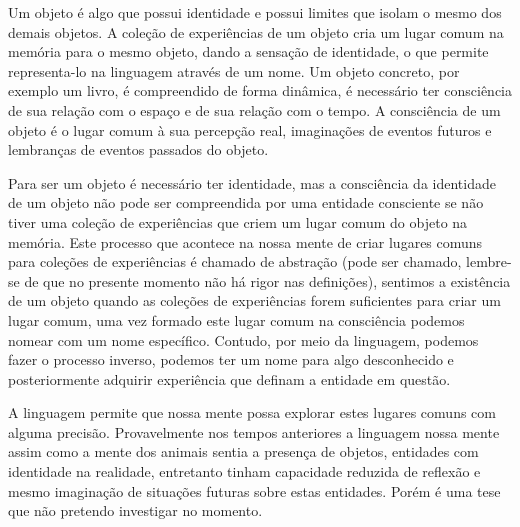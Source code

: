 \documentclass[10pt,a4paper]{report}
\begin{document}
\hspace{\baselineskip}

Um objeto é algo que possui identidade e possui limites que isolam o mesmo dos demais objetos. A coleção de experiências de um objeto cria um lugar comum na memória para o mesmo objeto, dando a sensação de identidade, o que permite representa-lo na linguagem através de um nome. Um objeto concreto, por exemplo um livro, é compreendido de forma dinâmica, é necessário ter consciência de sua relação com o espaço e de sua relação com o tempo. A consciência de um objeto é o lugar comum à sua percepção real, imaginações de eventos futuros e lembranças de eventos passados do objeto. 

\hspace{\baselineskip}

Para ser um objeto é necessário ter identidade, mas a consciência da identidade de um objeto não pode ser compreendida por uma entidade consciente se não tiver uma coleção de experiências que criem um lugar comum do objeto na memória. Este processo que acontece na nossa mente de criar lugares comuns para coleções de experiências é chamado de abstração (pode ser chamado, lembre-se de que no presente momento não há rigor nas definições), sentimos a existência de um objeto quando as coleções de experiências forem suficientes para criar um lugar comum, uma vez formado este lugar comum na consciência podemos nomear com um nome específico. Contudo, por meio da linguagem, podemos fazer o processo inverso, podemos ter um nome para algo desconhecido e posteriormente adquirir experiência que definam a entidade em questão.

\hspace{\baselineskip}

A linguagem permite que nossa mente possa explorar estes lugares comuns com alguma precisão. Provavelmente nos tempos anteriores a linguagem nossa mente assim como a mente dos animais sentia a presença de objetos, entidades com identidade na realidade, entretanto tinham capacidade reduzida de reflexão e mesmo imaginação de situações futuras sobre estas entidades. Porém é uma tese que não pretendo investigar no momento.
\end{document}
